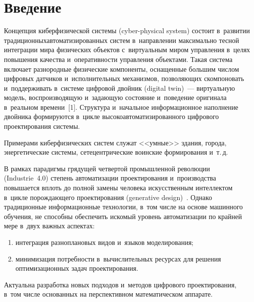 \thispagestyle{headings}

\begin{multicols}{2}

\label{st\stat}

\section{Введение}

Концепция киберфизической системы (cyber-physical system) состоит 
в~развитии традиционных\linebreak автоматизированных систем в~направлении 
максимально тесной интеграции мира физических объектов с~виртуальным 
миром управления в~целях повышения качества и~оперативности управления 
\mbox{объектами}. Такая сис\-те\-ма вклю\-ча\-ет разнородные физические компоненты, 
оснащенные большим чис\-лом цифровых датчиков и~исполнительных\linebreak 
механизмов, позволяющих скомпоновать и~поддерживать в~системе цифровой 
двойник (digital twin)~--- виртуальную модель, воспроизводящую и~за\-да\-ющую 
состояние и~поведение оригинала в~реальном времени~[1]. Структура 
и~начальное информационное наполнение двойника формируются в~цикле 
высокоавтоматизированного цифрового проектирования системы. 

Примерами 
киберфизических систем служат <<умные>> здания, города, энергетические 
системы, сетецентрические воинские формирования и~т.\,д.

В рамках парадигмы грядущей четвертой промышленной революции 
(Industrie~4.0) степень автоматизации проектирования и~производства 
повышается вплоть до полной замены человека \mbox{искусственным} интеллектом 
в~цикле по\-рож\-да\-юще\-го проектирования (generative design)~\cite{2-kov}. 
Однако традиционные информационные технологии, в~том числе на основе 
машинного обучения, не способны обеспечить искомый уровень автоматизации 
по крайней мере в~двух важных аспектах: 
\begin{enumerate}[(1)]
\item  интеграция 
разноплановых видов и~языков моделирования; 
\item  минимизация 
потребности в~вычислительных ресурсах для решения оптимизационных задач 
проектирования.
\end{enumerate}

 Актуальна разработка новых подходов и~методов цифрового 
проектирования, в~том числе основанных на перспективном математическом 
аппарате.


\end{multicols}
